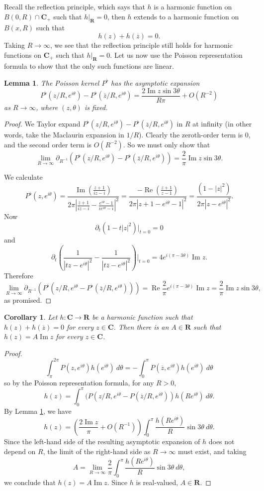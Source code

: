 \documentclass[12pt]{report}
\newcommand{\RR}{\mathbf{R}}
\newcommand{\CC}{\mathbf{C}}
\renewcommand{\Re}{\operatorname{Re}}
\renewcommand{\Im}{\operatorname{Im}}
\newtheorem{lemma}[theorem]{Lemma}
\newtheorem{corollary}[theorem]{Corollary}
\theoremstyle{definition}
\theoremstyle{remark}
\begin{document}
Recall the reflection principle, which says that $h$ is a harmonic function on $B(0, R) \cap \CC_+$ such that $h|_\RR = 0$, then $h$ extends to a harmonic function on $B(x, R)$ such that
$$h(z) + h(\overline z) = 0.$$
Taking $R \to \infty$, we see that the reflection principle still holds for harmonic functions on $\CC_+$ such that $h|_\RR = 0$. Let us now use the Poisson representation formula to show that the only such functions are linear.
\begin{lemma}
\label{asymptotics for the poisson kernel}
The Poisson kernel $P^\flat$ has the asymptotic expansion
$$P^\flat(z/R, e^{i\theta}) - P^\flat(\overline z/R, e^{i\theta}) = \frac{2\Im z \sin 3\theta}{R\pi} + O(R^{-2})$$
as $R \to \infty$, where $(z, \theta)$ is fixed.
\end{lemma}
\begin{proof}
We Taylor expand $P^\flat(z/R, e^{i\theta}) - P^\flat(\overline z/R, e^{i\theta})$ in $R$ at infinity (in other words, take the Maclaurin expansion in $1/R$). Clearly the zeroth-order term is $0$, and the second order term is $O(R^{-2})$. So we must only show that
$$\lim_{R \to \infty} \partial_{R^{-1}}(P^\flat(z/R, e^{i\theta}) - P^\flat(\overline z/R, e^{i\theta})) = \frac{2}{\pi} \Im z \sin 3\theta.$$

We calculate
$$P^\flat(z, e^{i\theta}) = \frac{\Im\left(\frac{z+1}{iz-i}\right)}{2\pi\left|\frac{z+1}{iz-i} - \frac{e^{i\theta} - 1}{ie^{i\theta} -i}\right|^2}
  = \frac{-\Re\left(\frac{z+1}{z-1}\right)}{2\pi|z + 1 - e^{i\theta} - 1|^2} = \frac{(1 - |z|^2)}{2\pi|z - e^{i\theta}|^2}.$$
Now
$$\partial_t (1 - t|z|^2)|_{t=0} = 0$$
and
$$\partial_t \left(\frac{1}{|tz - e^{i\theta}|^2} - \frac{1}{|t\overline z - e^{i\theta}|^2}\right)|_{t = 0} = 4e^{i(\pi - 3\theta)}\Im z.$$
Therefore
$$\lim_{R \to \infty} \partial_{R^{-1}}(P^\flat(z/R, e^{i\theta} - P^\flat(\overline z/R, e^{i\theta}))) = \Re \frac{2}{\pi}e^{i(\pi - 3\theta)}\Im z = \frac{2}{\pi} \Im z \sin 3\theta,$$
as promised.
\end{proof}
\begin{corollary}
\label{reflected harmonics are linear}
Let $h: \CC \to \RR$ be a harmonic function such that $h(z) + h(\overline z) = 0$ for every $z \in \CC$. Then there is an $A \in \RR$ such that $h(z) = A \Im z$ for every $z \in \CC$.
\end{corollary}
\begin{proof}
  $$\int_\pi^{2\pi} P(z, e^{i\theta})h(e^{i\theta}) ~d\theta = -\int_0^\pi P(\overline z, e^{i\theta})h(e^{i\theta}) ~d\theta$$
  so by the Poisson representation formula, for any $R > 0$,
  $$h(z) = \int_0^\pi (P(z/R, e^{i\theta} - P(\overline z/R, e^{i\theta}))h(Re^{i\theta})~d\theta.$$
  By Lemma \ref{asymptotics for the poisson kernel}, we have
  $$h(z) = \left(\frac{2\Im z}{\pi} + O(R^{-1})\right)\int_0^\pi \frac{h(Re^{i\theta})}{R}\sin 3\theta ~d\theta.$$
  Since the left-hand side of the resulting asymptotic expansion of $h$ does not depend on $R$, the limit of the right-hand side as $R \to \infty$ must exist, and taking
  $$A = \lim_{R \to \infty} \frac{2}{\pi}\int_0^\pi \frac{h(Re^{i\theta})}{R}\sin 3\theta ~d\theta,$$
  we conclude that $h(z) = A\Im z$. Since $h$ is real-valued, $A \in \RR$.
\end{proof}
\end{document}
